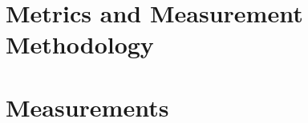 \documentclass[electronics,article,submit,moreauthors,pdftex,10pt,a4paper]{mdpi}
\theoremstyle{mdpi}
\newcounter{ex}
\newcounter{re}
\theoremstyle{mdpidefinition}
\begin{document}
\section{Metrics and Measurement Methodology}


\section{Measurements}








\end{document}
